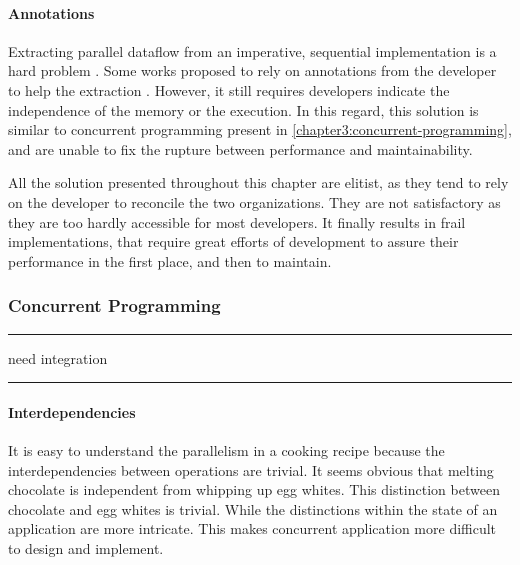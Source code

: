 \paragraph{Annotations}

Extracting parallel dataflow from an imperative, sequential implementation is a hard problem \cite{Johnston2004a}.
Some works proposed to rely on annotations from the developer to help the extraction \cite{Vandierendonck2010a,Fernandez2014a}.
However, it still requires developers indicate the independence of the memory or the execution.
In this regard, this solution is similar to concurrent programming present in \ref{chapter3:concurrent-programming}, and are unable to fix the rupture between performance and maintainability.

All the solution presented throughout this chapter are elitist, as they tend to rely on the developer to reconcile the two organizations.
They are not satisfactory as they are too hardly accessible for most developers.
It finally results in frail implementations, that require great efforts of development to assure their performance in the first place, and then to maintain.

\subsubsection{Concurrent Programming}


\begin{center}
\rule{3cm}{0.4pt}
need integration
\rule{3cm}{0.4pt}
\end{center}

\paragraph{Interdependencies}

It is easy to understand the parallelism in a cooking recipe because the interdependencies between operations are trivial.
It seems obvious that melting chocolate is independent from whipping up egg whites.
This distinction between chocolate and egg whites is trivial.
While the distinctions within the state of an application are more intricate.
This makes concurrent application more difficult to design and implement.

